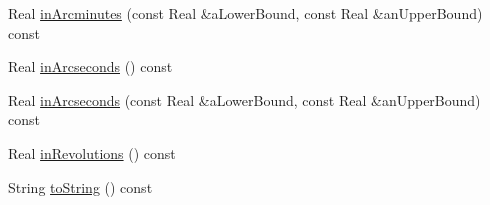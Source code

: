 \begin{DoxyCompactItemize}
\item 
Real \hyperlink{classlibrary_1_1math_1_1geom_1_1_angle_ab6c337dacd75f1bc5c49df77780833c1}{in\+Arcminutes} (const Real \&a\+Lower\+Bound, const Real \&an\+Upper\+Bound) const
\item 
Real \hyperlink{classlibrary_1_1math_1_1geom_1_1_angle_a2d285ab36453ff13c86689d799e97aa6}{in\+Arcseconds} () const
\item 
Real \hyperlink{classlibrary_1_1math_1_1geom_1_1_angle_a2118034e9248ed58f741241d4c02903c}{in\+Arcseconds} (const Real \&a\+Lower\+Bound, const Real \&an\+Upper\+Bound) const
\item 
Real \hyperlink{classlibrary_1_1math_1_1geom_1_1_angle_a5d7b4b12cc0019dec88ddb95c3d1be79}{in\+Revolutions} () const
\item 
String \hyperlink{classlibrary_1_1math_1_1geom_1_1_angle_aa70999f4e5b848719d846346126eb18d}{to\+String} () const
\end{DoxyCompactItemize}
